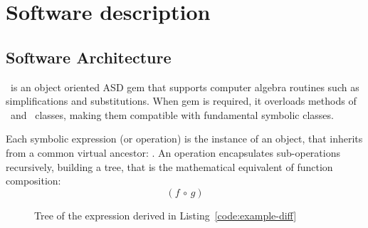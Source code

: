 
\section{Software description}
\label{sec:description}


\subsection{Software Architecture}
\label{sec:architecture}


\ragnicas~is an object oriented ASD gem that supports computer algebra routines such as simplifications and substitutions. When gem is required, it overloads methods of \Fixnum~and \Float~classes, making them compatible with fundamental symbolic classes.

Each symbolic expression (or operation) is the instance of an object, that inherits from a common virtual ancestor: \CASOp. An operation encapsulates sub-operations recursively, building a tree, that is the mathematical equivalent of function composition:
\begin{equation}
\left( f \, \circ \, g \right)
\end{equation}

\begin{figure}[ht!]
\centering

\caption{\label{fig:graph}Tree of the expression derived in Listing~\ref{code:example-diff}}
\end{figure}

